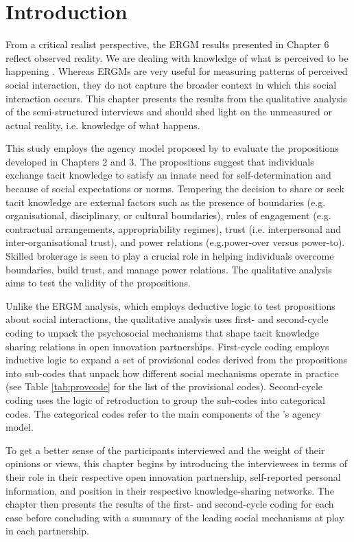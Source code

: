 \section{Introduction}

From a critical realist perspective, the ERGM results presented in Chapter 6 reflect observed reality. We are dealing with knowledge of what is perceived to be happening \citep{bhaskar2013realist}. Whereas ERGMs are very useful for measuring patterns of perceived social interaction, they do not capture the broader context in which this social interaction occurs. This chapter presents the results from the qualitative analysis of the semi-structured interviews and should shed light on the unmeasured or actual reality, i.e. knowledge of what happens. \medskip

This study employs the agency model proposed by \citet{loyal2001agency} to evaluate the propositions developed in Chapters 2 and 3. The propositions suggest that individuals exchange tacit knowledge to satisfy an innate need for self-determination and because of social expectations or norms. Tempering the decision to share or seek tacit knowledge are external factors such as the presence of boundaries (e.g. organisational, disciplinary, or cultural boundaries), rules of engagement (e.g. contractual arrangements, appropriability regimes), trust (i.e. interpersonal and inter-organisational trust), and power relations (e.g.power-over versus power-to). Skilled brokerage is seen to play a crucial role in helping individuals overcome boundaries, build trust, and manage power relations. The qualitative analysis aims to test the validity of the propositions. \medskip

Unlike the ERGM analysis, which employs deductive logic to test propositions about social interactions, the qualitative analysis uses first- and second-cycle coding to unpack the psychosocial mechanisms that shape tacit knowledge sharing relations in open innovation partnerships. First-cycle coding employs inductive logic to expand a set of provisional codes derived from the propositions into sub-codes that unpack how different social mechanisms operate in practice (see Table \ref{tab:provcode} for the list of the provisional codes). Second-cycle coding uses the logic of retroduction to group the sub-codes into categorical codes. The categorical codes refer to the main components of the \citet{loyal2001agency}'s agency model. \medskip

To get a better sense of the participants interviewed and the weight of their opinions or views, this chapter begins by introducing the interviewees in terms of their role in their respective open innovation partnership, self-reported personal information, and position in their respective knowledge-sharing networks. The chapter then presents the results of the first- and second-cycle coding for each case before concluding with a summary of the leading social mechanisms at play in each partnership.

